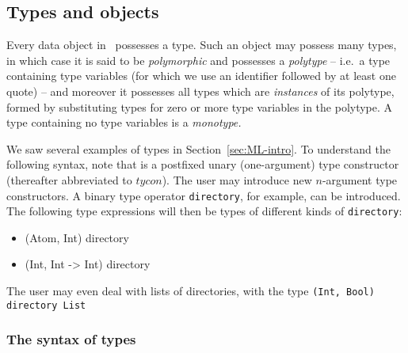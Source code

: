 \documentclass[11pt]{article}
\begin{document}
\subsection {Types and objects}


Every data object in \ML\ possesses a type. Such an object may possess
many types, in which case it is said to be {\it polymorphic\/} and
possesses a {\it polytype\/} -- i.e.\ a type containing type variables
(for which we use an identifier followed by at least one quote)
-- and moreover it possesses all types which are {\it instances\/} of
its polytype, formed by substituting types for zero or more type
variables in the polytype. A type containing no type variables is a
{\it monotype.}

We saw several examples of types in Section~\ref{sec:ML-intro}.  To
understand the following syntax, note that  is a postfixed
unary (one-argument) type constructor (thereafter abbreviated to
$tycon$).  The user may introduce new $n$-argument type constructors.
A binary type operator {\tt directory}, for example, can be
introduced.  The following type expressions will then be types of
different kinds of {\tt directory}:

\begin{itemize}\tt\setlength{\itemsep}{0mm}\vspace*{-2mm}
  \item (Atom, Int) directory
  \item (Int, Int -> Int) directory
\end{itemize}\vspace*{-2mm}

\noindent
The user may even deal with lists of directories, with the type
{\tt (Int, Bool) directory List}


\subsubsection{The syntax of types}

\end{document}
